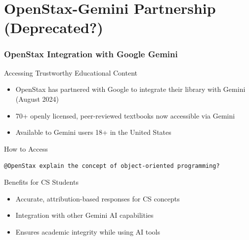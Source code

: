 \documentclass{beamer}
\begin{document}
\section{OpenStax-Gemini Partnership (Deprecated?)}
\frame{\sectionpage}

\begin{frame}
\frametitle{OpenStax Integration with Google Gemini}

\begin{block}{Accessing Trustworthy Educational Content}
\begin{itemize}
\item OpenStax has partnered with Google to integrate their library with Gemini (August 2024)
\item 70+ openly licensed, peer-reviewed textbooks now accessible via Gemini
\item Available to Gemini users 18+ in the United States
\end{itemize}
\end{block}

\begin{exampleblock}{How to Access}
\begin{center}
\texttt{@OpenStax explain the concept of object-oriented programming?}
\end{center}
\end{exampleblock}

\begin{alertblock}{Benefits for CS Students}
\begin{itemize}
\item Accurate, attribution-based responses for CS concepts
\item Integration with other Gemini AI capabilities
\item Ensures academic integrity while using AI tools
\end{itemize}
\end{alertblock}
\end{frame}
\end{document}
